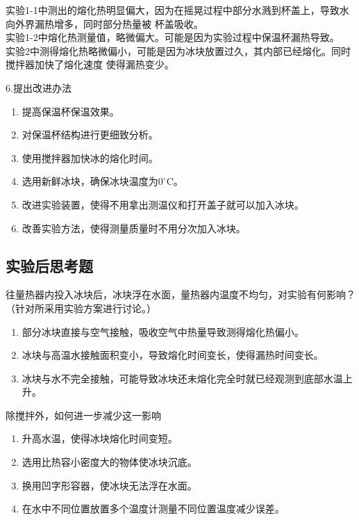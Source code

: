 \documentclass[dvipsnames, svgnames,a4paper,11pt]{article}
\begin{document}
实验1-1中测出的熔化热明显偏大，因为在摇晃过程中部分水溅到杯盖上，导致水向外界漏热增多，同时部分热量被
杯盖吸收。\\
实验1-2中熔化热测量值，略微偏大。可能是因为实验过程中保温杯漏热导致。\\
实验2中测得熔化热略微偏小，可能是因为冰块放置过久，其内部已经熔化。同时搅拌器加快了熔化速度
使得漏热变少。\par
\vspace{1cm}
6.提出改进办法\\
\begin{enumerate}
	\item 提高保温杯保温效果。
	\item 对保温杯结构进行更细致分析。
	\item 使用搅拌器加快冰的熔化时间。
	\item 选用新鲜冰块，确保冰块温度为$0^\circ$C。
	\item 改进实验装置，使得不用拿出测温仪和打开盖子就可以加入冰块。
	\item 改善实验方法，使得测量质量时不用分次加入冰块。
\end{enumerate}

\subsection{实验后思考题}
\begin{question}
	往量热器内投入冰块后，冰块浮在水面，量热器内温度不均匀，对实验有何影响？（针对所采用实验方案进行讨论。）
	\tcblower
	\begin{enumerate}
		\item 部分冰块直接与空气接触，吸收空气中热量导致测得熔化热偏小。
		\item 冰块与高温水接触面积变小，导致熔化时间变长，使得漏热时间变长。
		\item 冰块与水不完全接触，可能导致冰块还未熔化完全时就已经观测到底部水温上升。
	\end{enumerate}
\end{question}

\begin{question}
	除搅拌外，如何进一步减少这一影响
	\tcblower
	\begin{enumerate}
		\item 升高水温，使得冰块熔化时间变短。
		\item 选用比热容小密度大的物体使冰块沉底。
		\item 换用凹字形容器，使冰块无法浮在水面。
		\item 在水中不同位置放置多个温度计测量不同位置温度减少误差。
	\end{enumerate}
\end{question}
\end{document}
